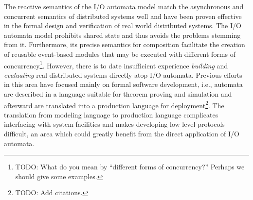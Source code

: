 
The reactive semantics of the I/O automata model match the asynchronous and concurrent semantics of distributed systems well and have been proven effective in the formal design and verification of real world distributed systems.
The I/O automata model prohibits shared state and thus avoids the problems stemming from it.
Furthermore, its precise semantics for composition facilitate the creation of reusable event-based modules that may be executed with different forms of concurrency\footnote{TODO: What do you mean by ``different forms of concurrency?''  Perhaps we should give some examples.}.
However, there is to date insufficient experience \emph{building} and \emph{evaluating} real distributed systems directly atop I/O automata.
Previous efforts in this area have focused mainly on formal software development, i.e., automata are described in a language suitable for theorem proving and simulation and afterward are translated into a production language for deployment\footnote{TODO:  Add citations.}.
The translation from modeling language to production language complicates interfacing with system facilities and makes developing low-level protocols difficult, an area which could greatly benefit from the direct application of I/O automata.

